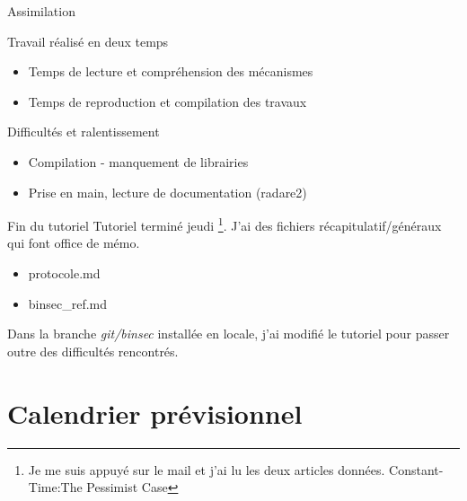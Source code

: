 \documentclass[A4,svgnames,9pt,aspectratio=169]{beamer}
\begin{document}

\begin{frame}{Assimilation}
  \begin{block}{Travail réalisé en deux temps}
    \begin{itemize}
      \item Temps de lecture et compréhension des mécanismes
      \item Temps de reproduction et compilation des travaux
    \end{itemize}
  \end{block}
\end{frame}


\begin{frame}{Difficultés et ralentissement}

  \begin{itemize}
    \item Compilation - manquement de librairies
    \item Prise en main, lecture de documentation (radare2)
  \end{itemize}
  
\end{frame}


\begin{frame}{Fin du tutoriel}
  Tutoriel terminé jeudi \footnote{Je me suis appuyé sur le mail et j'ai lu les deux articles données. Constant-Time:The Pessimist Case}. J'ai des fichiers récapitulatif/généraux qui font office de mémo.
  \begin{itemize}
    \item protocole.md
    \item binsec\_ref.md
  \end{itemize}

  Dans la branche \textit{git/binsec} installée en locale, j'ai modifié le tutoriel pour passer outre des difficultés rencontrés.

  
\end{frame}


\section{Calendrier prévisionnel}
\frame{\sectionpage}
\end{document}
